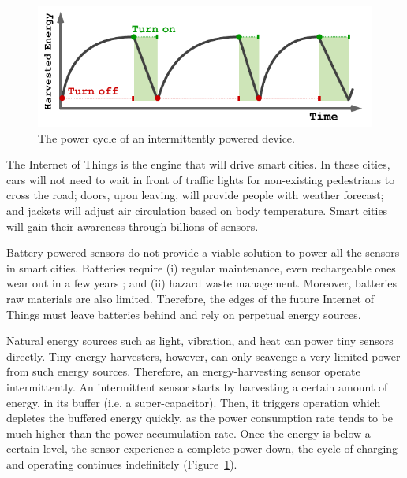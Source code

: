 \begin{figure}
	\centering
		\includegraphics[width=\columnwidth]{figures/PowerCycleIntermittentSystem}
		\caption{The power cycle of an intermittently powered device.}
		\label{fig:powerCycle}
\end{figure}

The Internet of Things is the engine that will drive smart cities. In these cities, cars will not need to wait in front of traffic lights for non-existing pedestrians to cross the road; doors, upon leaving, will provide people with weather forecast; and jackets will adjust air circulation based on body temperature. Smart cities will gain their awareness through billions of sensors.

Battery-powered sensors do not provide a viable solution to power all the sensors in smart cities. Batteries require (i) regular maintenance, even rechargeable ones wear out in a few years \cite{xxx}; and (ii) hazard waste management. Moreover, batteries raw materials are also limited. Therefore, the edges of the future Internet of Things must leave batteries behind and rely on perpetual energy sources. 

Natural energy sources such as light, vibration, and heat can power tiny sensors directly. Tiny energy harvesters, however, can only scavenge a very limited power from such energy sources. Therefore, an energy-harvesting sensor operate intermittently. An intermittent sensor starts by harvesting a certain amount of energy, in its buffer (i.e. a super-capacitor). Then, it triggers operation which depletes the buffered energy quickly, as the power consumption rate tends to be much higher than the power accumulation rate. Once the energy is below a certain level, the sensor experience a complete power-down, the cycle of charging and operating continues indefinitely (Figure~\ref{fig:powerCycle}). 

